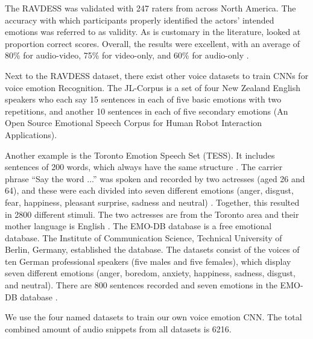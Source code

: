 The RAVDESS was validated with 247 raters from across North America. The accuracy with which participants properly identified the actors' intended emotions was referred to as validity. As is customary in the literature,  looked at proportion correct scores. Overall, the results were excellent, with an average of 80\% for audio-video, 75\% for video-only, and 60\% for audio-only \cite{livingstone_ryerson_2018}.

Next to the RAVDESS dataset, there exist other voice datasets to train CNNs for voice emotion Recognition. The JL-Corpus is a set of four New Zealand English speakers who each say 15 sentences in each of five basic emotions with two repetitions, and another 10 sentences in each of five secondary emotions (An Open Source Emotional Speech Corpus for Human Robot Interaction Applications).

Another example is the Toronto Emotion Speech Set (TESS). It includes sentences of 200 words,  which always have the same structure \cite{pichora-fuller_toronto_2020}. The carrier phrase ``Say the word ...'' was spoken and recorded by two actresses (aged 26 and 64), and these were each divided into seven different emotions (anger, disgust, fear, happiness, pleasant surprise, sadness and neutral) \cite{pichora-fuller_toronto_2020}. Together, this resulted in 2800 different stimuli. The two actresses are from the Toronto area and their mother language is English \cite{pichora-fuller_toronto_2020}. The EMO-DB database is a free emotional database. The Institute of Communication Science, Technical University of Berlin, Germany, established the database. The datasets consist of the voices of ten German professional speakers (five males and five females), which display seven different emotions (anger, boredom,  anxiety, happiness, sadness, disgust, and neutral). There are 800 sentences recorded and seven emotions in the EMO-DB database \cite{burkhardt_database_2005}.

We use the four named datasets to train our own voice emotion CNN. The total combined amount of audio snippets from all datasets is 6216.

